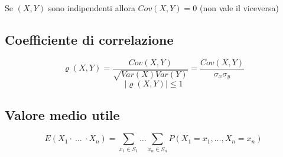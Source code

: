 Se $(X,Y)$ sono indipendenti allora $\mathit{Cov}(X,Y) = 0$ (non vale il viceversa)

\subsection*{Coefficiente di correlazione}
$$
\varrho(X,Y) = \frac{\mathit{Cov}(X,Y)}{\sqrt{\mathit{Var}(X) \mathit{Var}(Y)}}
= \frac{\mathit{Cov}(X,Y)}{\sigma_x \sigma_y}
$$
$$
|\varrho(X,Y)| \le 1
$$

\subsection*{Valore medio utile}
$$
E(X_1 \cdot \ \dots \ \cdot X_n) = \sum_{x_1 \in S_1} \dots \sum_{x_n \in S_n}
P(X_1=x_1, \dots, X_n=x_n)
$$